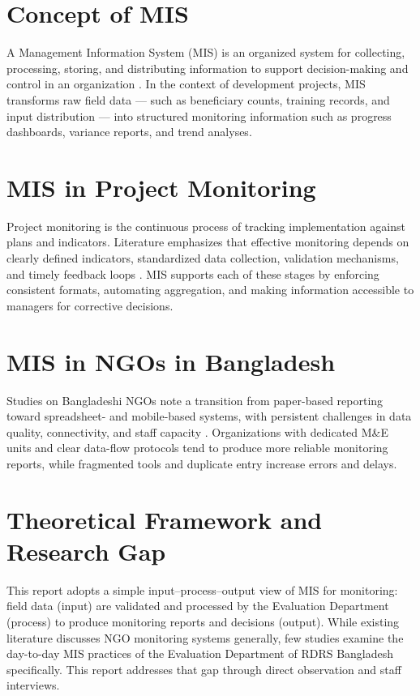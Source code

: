 \documentclass[12pt,a4paper]{report}
\begin{document}
\section{Concept of MIS}
A Management Information System (MIS) is an organized system for
collecting, processing, storing, and distributing information to support
decision-making and control in an organization \cite{laudon2022}. In the
context of development projects, MIS transforms raw field data --- such
as beneficiary counts, training records, and input distribution --- into
structured monitoring information such as progress dashboards, variance
reports, and trend analyses.

\section{MIS in Project Monitoring}
Project monitoring is the continuous process of tracking implementation
against plans and indicators. Literature emphasizes that effective
monitoring depends on clearly defined indicators, standardized data
collection, validation mechanisms, and timely feedback loops
\cite{naidoo2011}. MIS supports each of these stages by enforcing
consistent formats, automating aggregation, and making information
accessible to managers for corrective decisions.

\section{MIS in NGOs in Bangladesh}
Studies on Bangladeshi NGOs note a transition from paper-based reporting
toward spreadsheet- and mobile-based systems, with persistent challenges
in data quality, connectivity, and staff capacity \cite{nahmias2020}.
Organizations with dedicated M\&E units and clear data-flow protocols
tend to produce more reliable monitoring reports, while fragmented tools
and duplicate entry increase errors and delays.

\section{Theoretical Framework and Research Gap}
This report adopts a simple input--process--output view of MIS for
monitoring: field data (input) are validated and processed by the
Evaluation Department (process) to produce monitoring reports and
decisions (output). While existing literature discusses NGO monitoring
systems generally, few studies examine the day-to-day MIS practices of
the Evaluation Department of RDRS Bangladesh specifically. This report
addresses that gap through direct observation and staff interviews.
\end{document}
